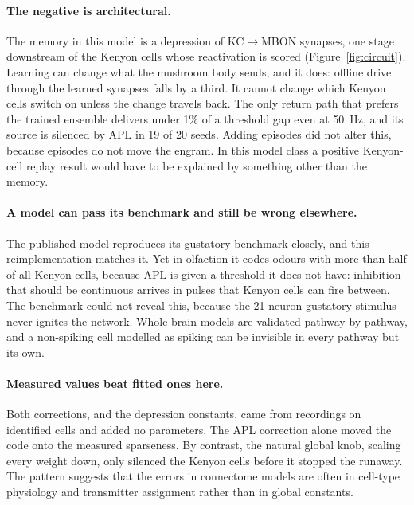 \documentclass[11pt]{article}
\newcommand{\KCMBON}{KC$\rightarrow$MBON}
\begin{document}
\paragraph{The negative is architectural.} The memory in this model is a depression of \KCMBON{} synapses, one stage downstream of the Kenyon cells whose reactivation is scored (Figure~\ref{fig:circuit}). Learning can change what the mushroom body sends, and it does: offline drive through the learned synapses falls by a third. It cannot change which Kenyon cells switch on unless the change travels back. The only return path that prefers the trained ensemble delivers under 1\% of a threshold gap even at 50~Hz, and its source is silenced by APL in 19 of 20 seeds. Adding episodes did not alter this, because episodes do not move the engram. In this model class a positive Kenyon-cell replay result would have to be explained by something other than the memory.

\paragraph{A model can pass its benchmark and still be wrong elsewhere.} The published model reproduces its gustatory benchmark closely, and this reimplementation matches it. Yet in olfaction it codes odours with more than half of all Kenyon cells, because APL is given a threshold it does not have: inhibition that should be continuous arrives in pulses that Kenyon cells can fire between. The benchmark could not reveal this, because the 21-neuron gustatory stimulus never ignites the network. Whole-brain models are validated pathway by pathway, and a non-spiking cell modelled as spiking can be invisible in every pathway but its own.

\paragraph{Measured values beat fitted ones here.} Both corrections, and the depression constants, came from recordings on identified cells and added no parameters. The APL correction alone moved the code onto the measured sparseness. By contrast, the natural global knob, scaling every weight down, only silenced the Kenyon cells before it stopped the runaway. The pattern suggests that the errors in connectome models are often in cell-type physiology and transmitter assignment rather than in global constants.
\end{document}
